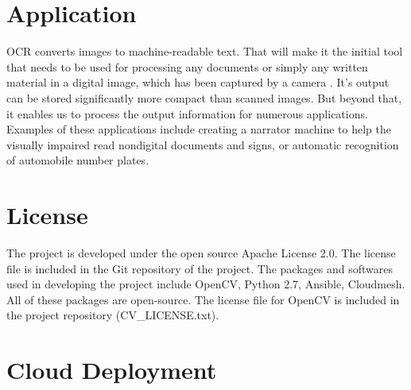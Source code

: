 \documentclass[9pt,twocolumn,twoside]{../../styles/osajnl}
\begin{document}
\section{Application}

OCR converts images to machine-readable text. That will make it the
initial tool that needs to be used for processing any documents or
simply any written material in a digital image, which has been
captured by a camera \cite{www-ocr-wiki}. It’s output can be stored significantly more
compact than scanned images. But beyond that, it enables us to process
the output information for numerous applications. Examples of these
applications include creating a narrator machine to help the visually
impaired read nondigital documents and signs, or automatic recognition
of automobile number plates.


\section{License}
The project is developed under the open source Apache License 2.0. The license
file is included in the Git repository of the project.
The packages and softwares used in developing the project include OpenCV,
Python 2.7, Ansible, Cloudmesh. All of these packages are open-source. 
The license file for OpenCV is included in the project repository
(CV\_LICENSE.txt).


\section{Cloud Deployment} 
\end{document}

